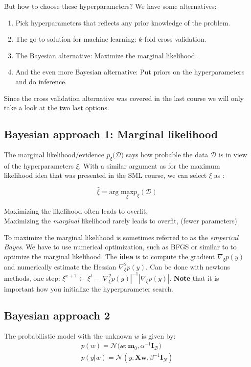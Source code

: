But how to choose these hyperparameters? We have some alternatives:

\begin{enumerate}
	\item Pick hyperparameters that reflects any prior knowledge of the problem.
	\item The go-to solution for machine learning: $k$-fold cross validation.
	\item The Bayesian alternative: Maximize the marginal likelihood.
	\item And the even more Bayesian alternative: Put priors on the hyperparameters and do inference. 
\end{enumerate}

Since the cross validation alternative was covered in the last course we will only take a look at the two last options.

\subsection{Bayesian approach 1: Marginal likelihood}
The marginal likelihood/evidence $p_\xi (\mathcal{D)}$ says how probable the data $\mathcal{D}$ is in view of the hyperparameters $\xi $. With a similar argument as for the maximum likelihood idea that was presented in the SML course, we can select $\xi $  as :

\begin{equation}
	\hat{\xi } = \text{arg } \underset{\xi }{\text{max}} p_\xi (\mathcal{D})   
\end{equation}

\begin{wbox}{}
Maximizing the likelihood often leads to overfit. \\
Maximizing the \emph{marginal} likelihood rarely leads to overfit, (fewer parameters)
\end{wbox}

To maximize the marginal likelihood is sometimes referred to as the \emph{emperical Bayes}. We have to use numerical optimization, such as BFGS or similar to to optimize the marginal likelihood. The \textbf{idea} is to compute the gradient $\nabla_\xi p(y)$ and numerically estimate the Hessian $\nabla ^{2}_\xi p(y)$. Can be done with newtons methods, one step: $\xi ^{x+1} \leftarrow \xi ^{t}- |\nabla ^{2}_\xi p(y)|^{-1}	|\nabla_\xi p(y)|$. \textbf{Note} that it is important how you initialize the hyperparameter search. 

\subsection{Bayesian approach 2}
The probabilistic model with the unknown $w$ is given by:
\begin{equation}
\begin{aligned}
	p(w) = \mathcal{N(w;\bm{m}_0, \alpha ^{-1}\bm{I}_D}) \\
	p(y|w) = \mathcal{N}(y; \bm{Xw}, \beta ^{-1} \bm{I}_N)
\end{aligned}
\end{equation}


